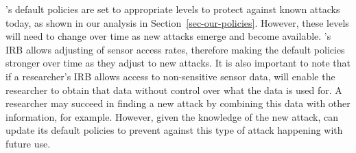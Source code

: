 \sysname's default policies are set to appropriate levels to protect against 
known attacks today, as shown in our analysis in Section~\ref{sec-our-policies}. 
However, these levels will need to change over time as
new attacks emerge and become available. \sysname's IRB allows adjusting 
of sensor access rates, therefore making the default policies
stronger over time as they adjust to new attacks. It is also important to note that 
if a researcher's IRB allows access to non-sensitive sensor data, \sysname will 
enable the researcher to obtain that data without control over what the data is used for.
A researcher may succeed in finding a new attack by combining this data with other 
information, for example. However, given the 
knowledge of the new attack, \sysname can update its default policies to prevent against
this type of attack happening with future use. 
%
%
%


